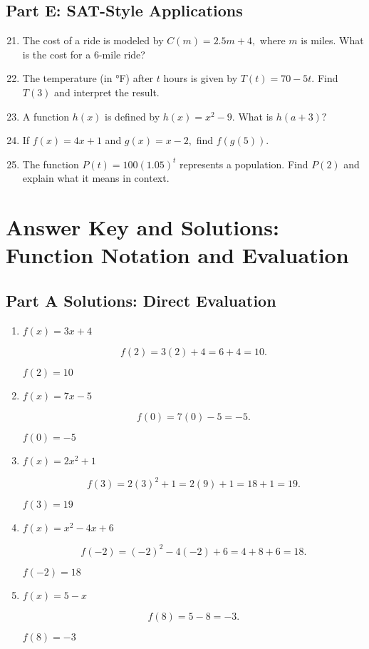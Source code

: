 \documentclass[12pt]{article}
\begin{document}
\subsection*{Part E: SAT-Style Applications}
\begin{enumerate}
  \setcounter{enumi}{20}
  \item The cost of a ride is modeled by \(C(m) = 2.5m + 4,\) where \(m\) is miles.  
  What is the cost for a 6-mile ride?
  \item The temperature (in °F) after \(t\) hours is given by \(T(t) = 70 - 5t.\)  
  Find \(T(3)\) and interpret the result.
  \item A function \(h(x)\) is defined by \(h(x) = x^2 - 9.\)  
  What is \(h(a + 3)?\)
  \item If \(f(x) = 4x + 1\) and \(g(x) = x - 2,\) find \(f(g(5)).\)
  \item The function \(P(t) = 100(1.05)^t\) represents a population.  
  Find \(P(2)\) and explain what it means in context.
\end{enumerate}

\newpage


\section*{Answer Key and Solutions: Function Notation and Evaluation}

\subsection*{Part A Solutions: Direct Evaluation}
\begin{enumerate}
  \item \(f(x) = 3x + 4\)

  \[
  f(2) = 3(2) + 4 = 6 + 4 = 10.
  \]

  \(\boxed{f(2) = 10}\)

  \item \(f(x) = 7x - 5\)

  \[
  f(0) = 7(0) - 5 = -5.
  \]

  \(\boxed{f(0) = -5}\)

  \item \(f(x) = 2x^2 + 1\)

  \[
  f(3) = 2(3)^2 + 1 = 2(9) + 1 = 18 + 1 = 19.
  \]

  \(\boxed{f(3) = 19}\)

  \item \(f(x) = x^2 - 4x + 6\)

  \[
  f(-2) = (-2)^2 - 4(-2) + 6 = 4 + 8 + 6 = 18.
  \]

  \(\boxed{f(-2) = 18}\)

  \item \(f(x) = 5 - x\)

  \[
  f(8) = 5 - 8 = -3.
  \]

  \(\boxed{f(8) = -3}\)
\end{enumerate}
\end{document}
